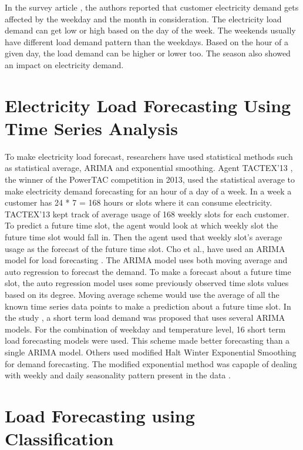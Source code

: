In the survey article \cite{hahn2009electric}, the authors reported that customer electricity demand gets affected by the weekday and the month in consideration. The electricity load demand can get low or high based on the day of the week. The weekends usually have different load demand pattern than the weekdays. Based on the hour of a given day, the load demand can be higher or lower too. The season also showed an impact on electricity demand. 

\section{Electricity Load Forecasting Using Time Series Analysis}

To make electricity load forecast, researchers have used statistical methods such as statistical average, ARIMA and exponential smoothing.  Agent TACTEX'13 \cite{urieli2014tactex}, the winner of the PowerTAC competition in 2013, used the statistical average to make electricity demand forecasting for an hour of a day of a week. In a week a customer has 24 * 7 = 168 hours or slots where it can consume electricity. TACTEX'13  kept track of average usage of 168 weekly slots for each customer. To predict a future time slot, the agent would look at which weekly slot the future time slot would fall in. Then the agent used that weekly slot's average usage as the forecast of the future time slot. Cho et al., have used an ARIMA model for load forecasting \cite{cho1995customer}. The ARIMA model uses both moving average and auto regression to forecast the demand. To make a forecast about a future time slot, the auto regression model uses some previously observed time slots values based on its degree. Moving average scheme would use the average of all the known time series data points to make a prediction about a future time slot. In the study \cite{amjady2001short}, a short term load demand was proposed that uses several ARIMA models. For the combination of weekday and temperature level, 16 short term load forecasting models were used. This scheme made better forecasting than a single ARIMA model. Others used modified Halt Winter Exponential Smoothing for demand forecasting. The modified exponential method was capaple of dealing with weekly and daily seasonality pattern present in the data \cite{jalil2013electricity}.    


\section{Load Forecasting using Classification}


